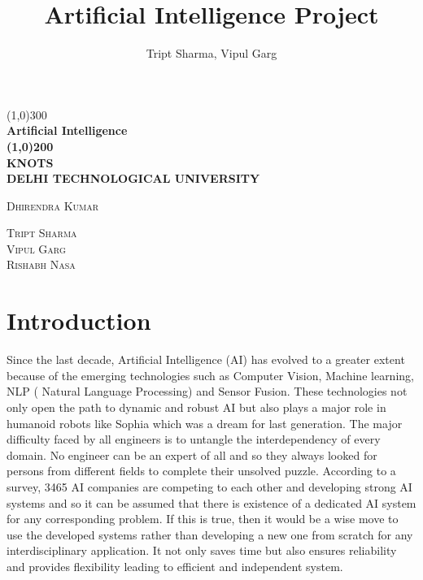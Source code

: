\documentclass{article}
\title{Artificial Intelligence Project}
\author{Tript Sharma, Vipul Garg}
\begin{document}
	\begin{titlepage}
		\begin{center}
			\line(1,0){300}\\
			[0.25in]
			\huge\bfseries Artificial Intelligence\\
			[2mm]
			\line(1,0){200}\\
			[0.5in]
			
			\uppercase{\huge KNOTS}\\
			[0.75cm]
			
			\uppercase{\large Delhi Technological University}\\
			[10cm]
			
		\end{center}
		\begin{flushleft}
			\textsc{\large Dhirendra Kumar} \\
		\end{flushleft}
			
		\begin{flushright}
			\textsc{\large Tript Sharma\\ 
			\large Vipul Garg\\
			\large Rishabh Nasa \\}
		\end{flushright}
		
	\end{titlepage}
	
	\section[1.]{Introduction}
Since the last decade, Artificial Intelligence (AI) has evolved to a greater extent because of the emerging technologies such as Computer Vision, Machine learning, NLP ( Natural Language Processing) and Sensor Fusion. These technologies not only open the path to dynamic and robust AI but also plays a major role in humanoid robots like Sophia which was  a dream for last generation. The major difficulty faced by all engineers is to untangle the interdependency of every domain. No engineer can be an expert of all and so they always looked for persons from different fields to complete their unsolved puzzle. According to a survey, 3465 AI companies are competing to each other and developing strong AI systems and so it can be assumed that there is existence of a dedicated AI system for any corresponding problem. If this is true, then it would be a wise move to use the developed systems rather than developing a new one from scratch for any interdisciplinary application. It not only saves time but also ensures reliability and provides flexibility leading to efficient and independent system.
\end{document}
